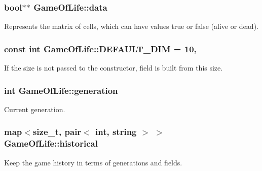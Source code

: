 \subsubsection[{data}]{\setlength{\rightskip}{0pt plus 5cm}bool$\ast$$\ast$ Game\+Of\+Life\+::data\hspace{0.3cm}{\ttfamily [private]}}\hypertarget{classGameOfLife_a6e0a1d177ae3dd8c687ed766e57b3d36}{}\label{classGameOfLife_a6e0a1d177ae3dd8c687ed766e57b3d36}
Represents the matrix of cells, which can have values true or false (alive or dead). 
\subsubsection[{D\+E\+F\+A\+U\+L\+T\+\_\+\+D\+IM}]{\setlength{\rightskip}{0pt plus 5cm}const int Game\+Of\+Life\+::\+D\+E\+F\+A\+U\+L\+T\+\_\+\+D\+IM = 10\hspace{0.3cm}{\ttfamily [static]}, {\ttfamily [private]}}\hypertarget{classGameOfLife_a15976a2df224994b6fa2ca57242fd093}{}\label{classGameOfLife_a15976a2df224994b6fa2ca57242fd093}
If the size is not passed to the constructor, field is built from this size. 
\subsubsection[{generation}]{\setlength{\rightskip}{0pt plus 5cm}int Game\+Of\+Life\+::generation\hspace{0.3cm}{\ttfamily [private]}}\hypertarget{classGameOfLife_aab1dc4078fe46596650d64ad50313555}{}\label{classGameOfLife_aab1dc4078fe46596650d64ad50313555}
Current generation. 
\subsubsection[{historical}]{\setlength{\rightskip}{0pt plus 5cm}map$<$size\+\_\+t, pair$<$ int, string $>$ $>$ Game\+Of\+Life\+::historical\hspace{0.3cm}{\ttfamily [private]}}\hypertarget{classGameOfLife_a11909babb91108b22e157efd3b2f75b8}{}\label{classGameOfLife_a11909babb91108b22e157efd3b2f75b8}
Keep the game history in terms of generations and fields. 
